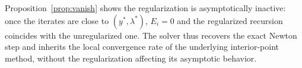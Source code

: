\documentclass[class=scrbook, crop=false]{standalone}
\begin{document}
Proposition~\ref{prop:vanish} shows the regularization is asymptotically inactive: once the iterates are close to $(y^*,\lambda^*)$, $E_i=0$ and the regularized recursion coincides
with the unregularized one. The solver thus recovers the exact Newton step and inherits the local convergence rate of the underlying interior-point method, without the regularization affecting its asymptotic behavior.





\end{document}
